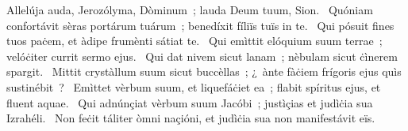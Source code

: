{ Allelúja}
{%
auda, Jerozólyma, Dòminum~; lauda Deum tuum, Sion. 
~Quóniam confortávit sèras portárum tuárum~; benedíxit fíliïs tuïs in te. 
~Qui pósuit fines tuos paċem, et àdipe frumènti sátiat te. 
~Qui emìttit elóquium suum terrae~; velóċiter currit sermo ejus. 
~Qui dat nivem sicut lanam~; nèbulam sicut ċìnerem spargit. 
~Mittit crystàllum suum sicut buccèllas~; ¿~ànte fàċiem frígoris ejus quìs sustinébit~? 
~Emìttet vèrbum suum, et liquefáċiet ea~; flabit spíritus ejus, et fluent aquae. 
~Qui adnúnçiat vèrbum suum Jacóbi~; justìçias et judìċia sua Izrahéli. 
~Non feċit táliter òmni naçióni, et judìċia sua non manifestávit eïs. 
}
